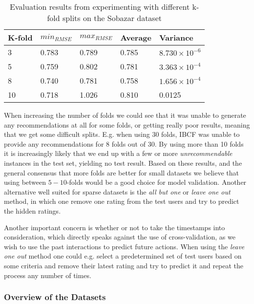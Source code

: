 \begin{table}[H]
\centering
\begin{tabular}{|l|l|l|l|l|}
\hline
K-fold & 	$min_{RMSE}$ 	&	$max_{RMSE}$ 	& Average 	& Variance 					\\ \hline
3	   & 	0.783 			& 	0.789 			& 0.785 	& $8.730 \times 10^{-6}$	\\ \hline
5	   & 	0.759			& 	0.802 			& 0.781 	& $3.363 \times 10^{-4}$ 	\\ \hline
8	   & 	0.740			& 	0.781			& 0.758 	& $1.656 \times 10^{-4}$ 	\\ \hline
10	   & 	0.718 			& 	1.026			& 0.810  	& 0.0125					\\ \hline
\end{tabular}
\caption{Evaluation results from experimenting with different k-fold splits on the Sobazar dataset}
\end{table}


When increasing the number of folds we could see that it was unable to generate
any recommendations at all for some folds, or getting really poor results, meaning
that we get some difficult splits. E.g. when using 30 folds, IBCF was unable to
provide any recommendations for 8 folds out of 30. By using more than 10 folds
it is increasingly likely that we end up with a few or more \emph{unrecommendable} 
instances in the test set, yielding no test result. Based on these results,
and the general consensus that more folds are better for small datasets we
believe that using between $5-10$-folds would be a good choice for model validation.
Another alternative well suited for sparse datasets is the \emph{all but one} or
\emph{leave one out} method, in which one remove one rating from the test users
and try to predict the hidden ratings.

Another important concern is whether or not to take the timestamps into consideration,
which directly speaks against the use of cross-validation, as we wish to use the past
interactions to predict future actions. When using the \emph{leave one out} method one
could e.g. select a predetermined set of test users based on some criteria and remove
their latest rating and try to predict it and repeat the process any number of times.


\subsubsection{Overview of the Datasets}

